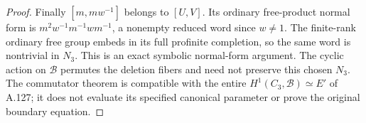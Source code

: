 \begin{proof}
Finally \([m,mw^{-1}]\) belongs to \([U,V]\). Its ordinary
free-product normal form is
\(m^2w^{-1}m^{-1}wm^{-1}\), a nonempty reduced word since
\(w\ne1\). The finite-rank ordinary free group embeds in
its full profinite completion, so the same word is nontrivial
in \(N_3\). This is an exact symbolic normal-form argument.
The cyclic action on \(\mathcal B\) permutes the deletion
fibers and need not preserve this chosen \(N_3\).
The commutator theorem is compatible with the entire
\(H^1(C_3,\mathcal B)\simeq E'\) of A.127; it does not
evaluate its specified canonical parameter or prove the
original boundary equation.
\end{proof}
